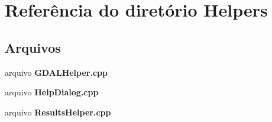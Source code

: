 \section{Referência do diretório Helpers}
\label{dir_628015d55d8603f5e5b8fb2a6671edda}
\subsection*{Arquivos}
\begin{DoxyCompactItemize}
\item 
arquivo {\bf G\+D\+A\+L\+Helper.\+cpp}
\item 
arquivo {\bf Help\+Dialog.\+cpp}
\item 
arquivo {\bf Results\+Helper.\+cpp}
\end{DoxyCompactItemize}
